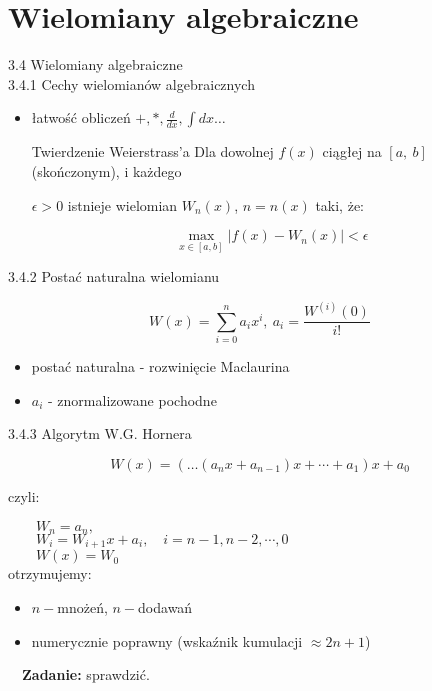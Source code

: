 \section{Wielomiany algebraiczne}
	\begin{frame}{3.4 Wielomiany algebraiczne \\ 3.4.1 Cechy wielomianów algebraicznych}


	\begin{itemize}
	\item łatwość obliczeń $+, *, \displaystyle \frac{d}{dx}, \displaystyle \int dx\ldots $ \newline


    \begin{block}{Twierdzenie Weierstrass'a}
    Dla dowolnej $f(x)$ ciągłej na $[a,\ b]$ (skończonym), i każdego

    $\epsilon>0$ istnieje wielomian $W_{n}(x)$, $n=n(x)$ taki, że:

	\[ \max\limits_{x \in [a,b]}|f(x)-W_{n}(x)|<\epsilon \]


  	\end{block}
    \end{itemize}

	\end{frame}

    \begin{frame}{3.4.2 Postać naturalna wielomianu}
    \begin{block}{}
		$$W(x)=\sum_{i=0}^{n}a_{i}x^{i},\ a_{i}=\frac{W^{(i)}(0)}{i!}$$
    \end{block}
        \begin{itemize}
        \item postać naturalna - rozwinięcie Maclaurina \\

        \item $a_{i}$ - znormalizowane pochodne
		\end{itemize}
    \end{frame}

    \begin{frame}{3.4.3 Algorytm W.G. Hornera}
    \setlength\parindent{24pt}
	\begin{block}{}
		$$W(x)=(\ldots(a_{n}x+a_{n-1})x+\cdots+a_{1})x+a_{0}$$
	\end{block}
	czyli:

	$\qquad W_{n}=a_{n},$ \\

	$\qquad W_{i}=W_{i+1}x+a_{i}, \quad i=n-1, n-2, \cdots , 0$ \\

	$\qquad W(x)=W_{0}$ \\

	otrzymujemy:
	\begin{itemize}
	\item $n-$mnożeń, $n -$dodawań
	\item numerycznie poprawny (wskaźnik kumulacji $\approx 2n+1$)
	\end{itemize}
    \vspace{3mm}
	$\quad$\textbf{Zadanie:} sprawdzić.
    \end{frame}

